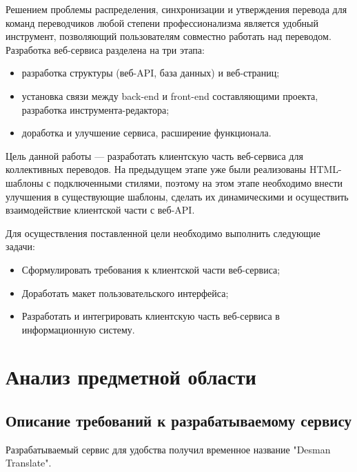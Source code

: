 \documentclass[a4paper,12pt]{article}
\begin{document}
Решением проблемы распределения, синхронизации и утверждения перевода для команд переводчиков любой степени профессионализма является удобный инструмент, позволяющий пользователям совместно работать над переводом.\\

Разработка веб-сервиса разделена на три этапа:
\begin{itemize}
	\item разработка структуры (веб-API, база данных) и веб-страниц;
	\item установка связи между back-end и front-end составляющими проекта, разработка инструмента-редактора;
	\item доработка и улучшение сервиса, расширение функционала.\\
\end{itemize}

Цель данной работы — разработать клиентскую часть веб-сервиса для коллективных переводов. На предыдущем этапе уже были реализованы HTML-шаблоны с подключенными стилями, поэтому на этом этапе необходимо внести улучшения в существующие шаблоны, сделать их динамическими и осуществить взаимодействие клиентской части с веб-API.

Для осуществления поставленной цели необходимо выполнить следующие задачи:
\begin{itemize}
	\item Сформулировать требования к клиентской части веб-сервиса;
	\item Доработать макет пользовательского интерфейса;
	\item Разработать и интегрировать клиентскую часть веб-сервиса в информационную систему.
\end{itemize}





\newpage
\section{Анализ предметной области}
\subsection{Описание требований к разрабатываемому сервису}

Разрабатываемый сервис для удобства получил временное название "Desman Translate".\\
\end{document}
